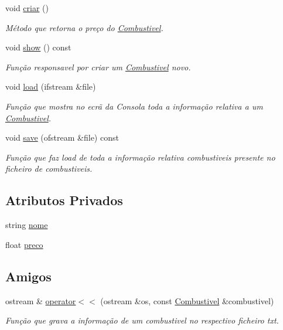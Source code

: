 \begin{DoxyCompactItemize}
void \hyperlink{class_combustivel_a4d1c201ebce40ff26f47d289a3c77c5e}{criar} ()
\begin{DoxyCompactList}\small\item\em Método que retorna o preço do \hyperlink{class_combustivel}{Combustivel}. \end{DoxyCompactList}\item 
void \hyperlink{class_combustivel_a1b96054fb39f1a8abadf0dbb3b4e6795}{show} () const 
\begin{DoxyCompactList}\small\item\em Função responsavel por criar um \hyperlink{class_combustivel}{Combustivel} novo. \end{DoxyCompactList}\item 
void \hyperlink{class_combustivel_a8c56fe49436bf236ff3e1f652cee7a00}{load} (ifstream \&file)
\begin{DoxyCompactList}\small\item\em Função que mostra no ecrã da Consola toda a informação relativa a um \hyperlink{class_combustivel}{Combustivel}. \end{DoxyCompactList}\item 
void \hyperlink{class_combustivel_a33e0390d12dc70d302ce0c8a3c4cfb3e}{save} (ofstream \&file) const 
\begin{DoxyCompactList}\small\item\em Função que faz load de toda a informação relativa combustiveis presente no ficheiro de combustiveis. \end{DoxyCompactList}\end{DoxyCompactItemize}
\subsection*{Atributos Privados}
\begin{DoxyCompactItemize}
\item 
string \hyperlink{class_combustivel_adfa329c4c4b60abcb87c1f3c82be4145}{nome}
\item 
float \hyperlink{class_combustivel_ac910a8410930ba553861f584da9f48d1}{preco}
\end{DoxyCompactItemize}
\subsection*{Amigos}
\begin{DoxyCompactItemize}
\item 
ostream \& \hyperlink{class_combustivel_aa2eefe07fdd78b0fa4dfbb6465cf0075}{operator$<$$<$} (ostream \&os, const \hyperlink{class_combustivel}{Combustivel} \&combustivel)
\begin{DoxyCompactList}\small\item\em Função que grava a informação de um combustivel no respectivo ficheiro txt. \end{DoxyCompactList}\end{DoxyCompactItemize}


